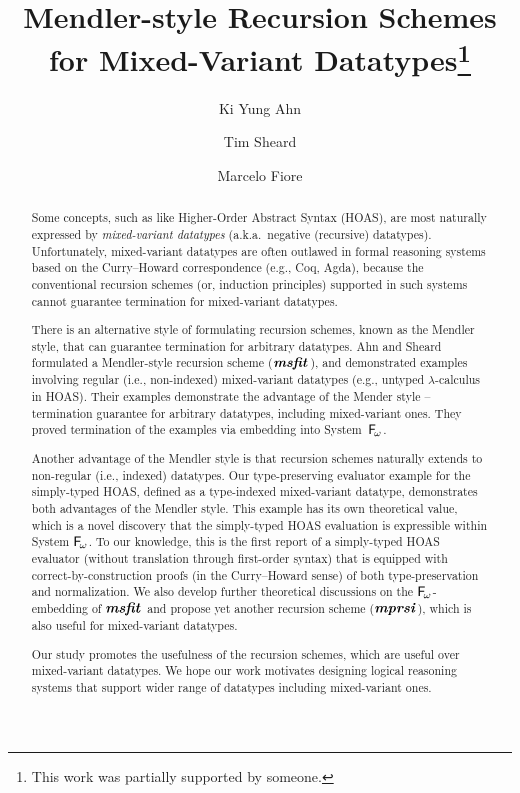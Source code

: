 \documentclass[a4paper,UKenglish]{lipics}
\title{Mendler-style Recursion Schemes for Mixed-Variant Datatypes\footnote{
	This work was partially supported by someone.} }
\author[1]{Ki Yung Ahn}
\author[1]{Tim Sheard}
\author[2]{Marcelo Fiore}
\affil[1]{Department of Computer Science, Portland State University\\
  Oregon, USA\\
  \texttt{\{kya,sheard\}@cs.pdx.edu}}
\affil[2]{Computer Laboratory, University of Cambridge\\
  Cambridge, UK\\
  \texttt{Marcelo.Fiore@cl.cam.ac.uk}}
\newcommand{\eg}[0]{{e.g.}}
\newcommand{\ie}[0]{{i.e.}}
\newcommand{\aka}[0]{{a.k.a.}}
\newcommand{\Fw}[0]{{\ensuremath{\mathsf{\uppercase{F}}_{\!\omega}}}}
\newcommand{\msfit}[1]{\ensuremath{\textbf{\textit{msfit}}_{#1}}}
\newcommand{\mprsi}[1]{\ensuremath{\textbf{\textit{mprsi}}_{#1}}}
\begin{document}
\maketitle

\begin{abstract}
Some concepts, such as like Higher-Order Abstract Syntax (HOAS),
are most naturally expressed by \emph{mixed-variant datatypes}
(\aka\ negative (recursive) datatypes). Unfortunately,
mixed-variant datatypes are often outlawed in formal reasoning systems
based on the Curry--Howard correspondence (\eg, Coq, Agda), because
the conventional recursion schemes (or, induction principles) supported in
such systems cannot guarantee termination for mixed-variant datatypes.

There is an alternative style of formulating recursion schemes,
known as the Mendler style, that can guarantee termination for
arbitrary datatypes. Ahn and Sheard \cite{AhnShe11} formulated
a Mendler-style recursion scheme (\msfit{}), and demonstrated
examples involving regular (\ie, non-indexed) mixed-variant datatypes
(\eg, untyped $\lambda$-calculus in HOAS). Their examples demonstrate
the advantage of the Mender style -- termination guarantee for
arbitrary datatypes, including mixed-variant ones. They proved
termination of the examples via embedding into System~\Fw.

Another advantage of the Mendler style is that recursion schemes
naturally extends to non-regular (\ie, indexed) datatypes.
Our type-preserving evaluator example for the simply-typed HOAS, defined as
a type-indexed mixed-variant datatype, demonstrates both advantages of
the Mendler style. This example has its own theoretical value, which is
a novel discovery that the simply-typed HOAS evaluation is expressible
within System \Fw. To our knowledge, this is the first report of
a simply-typed HOAS evaluator (without translation through first-order syntax)
that is equipped with correct-by-construction proofs
(in the Curry--Howard sense) of both type-preservation and normalization.
We also develop further theoretical discussions on the \Fw-embedding of \msfit{}
and propose yet another recursion scheme (\mprsi{}), which is also useful for
mixed-variant datatypes.

Our study promotes the usefulness of the recursion schemes,
which are useful over mixed-variant datatypes. We hope our
work motivates designing logical reasoning systems that support
wider range of datatypes including mixed-variant ones.
\end{abstract}
\end{document}
